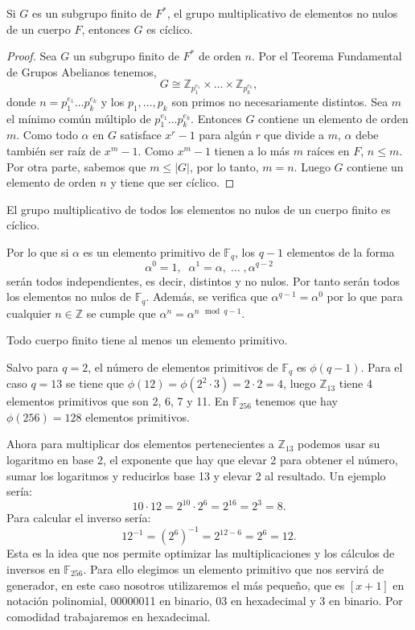 \begin{teorema}
		Si $G$ es un subgrupo finito de $F^*$, el grupo multiplicativo de elementos no nulos de un cuerpo $F$, entonces $G$ es cíclico.
\end{teorema}\vspace*{-7mm}
\begin{proof}
		Sea $G$ un subgrupo finito de $F^*$ de orden $n$. Por el Teorema Fundamental de Grupos Abelianos tenemos,
		$$
			G \cong \mathbb{Z}_{p^{e_1}_1}\times \dots \times \mathbb{Z}_{p^{e_k}_k},
		$$
		donde $n = p^{e_1}_1 \dots p^{e_k}_k$ y los $p_1, \dots, p_k$ son primos no necesariamente distintos. Sea $m$ el mínimo común múltiplo de $p^{e_1}_1 \dots p^{e_k}_k$. Entonces $G$ contiene un elemento de orden $m$. Como todo $\alpha$ en $G$ satisface $x^r-1$ para algún $r$ que divide a $m$, $\alpha$ debe también ser raíz de $x^m-1$. Como $x^m-1$ tienen a lo más $m$ raíces en $F$, $n\leq m$. Por otra parte, sabemos que $m\leq |G|$, por lo tanto, $m=n$. Luego $G$ contiene un elemento de orden $n$ y tiene que ser cíclico.\qedhere
\end{proof}

\begin{corolario}
		El grupo multiplicativo de todos los elementos no nulos de un cuerpo finito es cíclico.
\end{corolario}

Por lo que si $\alpha$ es un elemento primitivo de $\mathbb{F}_q$, los $q-1$ elementos de la forma\\
$$
	\alpha^0=1,\;\; \alpha^1=\alpha,\;\dots\; ,\alpha^{q-2}
$$
serán todos independientes, es decir, distintos y no nulos. Por tanto serán todos los elementos no nulos de $\mathbb{F}_q$. Además, se verifica que $\alpha^{q-1}=\alpha^0$ por lo que para cualquier $n \in \mathbb{Z}$ se cumple que $\alpha^n=\alpha^{n\mod q-1}$.\\

\begin{teorema}
	Todo cuerpo finito tiene al menos un elemento primitivo.
\end{teorema}
Salvo para $q=2$, el número de elementos primitivos de $\mathbb{F}_q$ es $\phi(q-1)$. Para el caso $q=13$ se tiene que $\phi(12)=\phi(2^2\cdot 3)=2\cdot2=4$, luego $\mathbb{Z}_{13}$ tiene 4 elementos primitivos que son 2, 6, 7 y 11. En $\mathbb{F}_{256}$ tenemos que hay $\phi(256)=128$ elementos primitivos.

Ahora para multiplicar dos elementos pertenecientes a $\mathbb{Z}_{13}$ podemos usar su logaritmo en base 2, el exponente que hay que elevar 2 para obtener el número, sumar los logaritmos y reducirlos base 13 y elevar 2 al resultado. Un ejemplo sería:
$$
	10\cdot12=2^{10}\cdot2^{6}=2^{16}=2^3=8.
$$
Para calcular el inverso sería:
$$
	12^{-1}=(2^6)^{-1}=2^{12-6}=2^6=12.
$$
Esta es la idea que nos permite optimizar las multiplicaciones y los cálculos de inversos en $\mathbb{F}_{256}$. Para ello elegimos un elemento primitivo que nos servirá de generador, en este caso nosotros utilizaremos el más pequeño, que es $[x+1]$ en notación polinomial, 00000011 en binario, 03 en hexadecimal y 3 en binario. Por comodidad trabajaremos en hexadecimal. 

